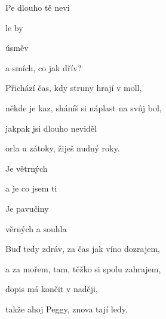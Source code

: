 


\zs
{} Pe  dlouho  tě nevi   

 le  by      

  úsměv  

a  smích, co  jak dřív?
\ks

\zs
Přichází čas, kdy struny hrají v moll,

někde je kaz, sháníš si náplast na svůj bol,

jakpak jsi dlouho neviděl

orla u zátoky, žiješ nudný roky.
\ks

\zr
Je   větrných 

a  je  co jsem ti  

Je   pavučiny  

věrných   a souhla
\kr

\zs
Buď tedy zdráv, za čas jak víno dozrajem,

a za mořem, tam, těžko si spolu zahrajem,

dopis má končit v naději,

takže ahoj Peggy, znova tají ledy.
\ks

\kp





